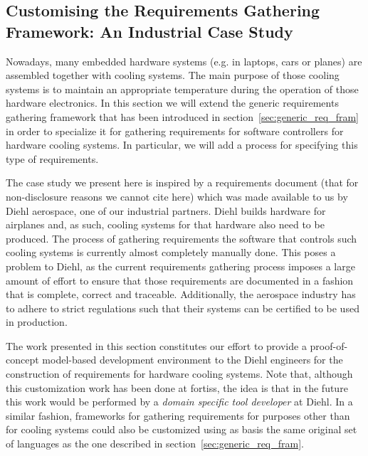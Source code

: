 

\subsection{Customising the Requirements Gathering Framework: An Industrial Case
Study}
\label{sec:custom_frame}

Nowadays, many embedded hardware systems (e.g. in laptops, cars or planes) are
assembled together with cooling systems. The main purpose of those cooling
systems is to maintain an appropriate temperature during the operation of those
hardware electronics. In this section we will extend the generic requirements
gathering framework that has been introduced in
section~\ref{sec:generic_req_fram} in order to specialize it for gathering
requirements for software controllers for hardware cooling systems. In
particular, we will add a process for specifying this type of requirements.

The case study we present here is inspired by a requirements document (that for
non-disclosure reasons we cannot cite here) which was made available to us by
Diehl aerospace, one of our industrial partners. Diehl builds hardware for
airplanes and, as such, cooling systems for that hardware also need to be
produced. The process of gathering requirements the software that controls such
cooling systems is currently almost completely manually done. This poses a
problem to Diehl, as the current requirements gathering process imposes a large
amount of effort to ensure that those requirements are documented in a fashion
that is complete, correct and traceable. Additionally, the aerospace industry
has to adhere to strict regulations such that their systems can be certified to
be used in production. 

The work presented in this section constitutes our effort to provide
a proof-of-concept model-based development environment to the Diehl engineers
for the construction of requirements for hardware cooling systems.
Note that, although this customization work has been done at fortiss, the idea
is that in the future this work would be performed by a \emph{domain specific tool
developer} at Diehl. In a similar fashion, frameworks for gathering requirements for purposes
other than for cooling systems could also be customized using as basis the same
original set of languages as the one described in
section~\ref{sec:generic_req_fram}.

